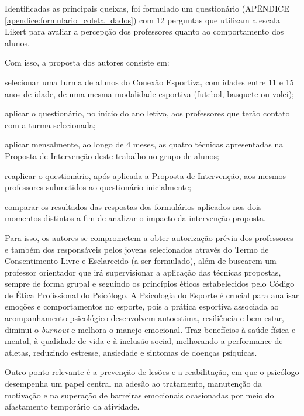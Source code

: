 \begin{Desenvolvimento}
Identificadas as principais queixas, foi formulado um questionário (APÊNDICE \ref{apendice:formulario_coleta_dados}) com 12 perguntas que utilizam a escala Likert para avaliar a percepção dos professores quanto ao comportamento dos alunos.

Com isso, a proposta dos autores consiste em:
\begin{alinea}
  \item selecionar uma turma de alunos do Conexão Esportiva, com idades entre 11 e 15 anos de idade, de uma mesma modalidade esportiva (futebol, basquete ou volei);
  \item aplicar o questionário, no início do ano letivo, aos professores que terão contato com a turma selecionada;
  \item aplicar mensalmente, ao longo de 4 meses, as quatro técnicas apresentadas na Proposta de Intervenção deste trabalho no grupo de alunos;
  \item reaplicar o questionário, após aplicada a Proposta de Intervenção, aos mesmos professores submetidos ao questionário inicialmente;
  \item comparar os resultados das respostas dos formulários aplicados nos dois momentos distintos a fim de analizar o impacto da intervenção proposta.
\end{alinea}

Para isso, os autores se comprometem a obter autorização prévia dos professores e também dos responsáveis pelos jovens selecionados através do Termo de Consentimento Livre e Esclarecido (a ser formulado), além de buscarem um professor orientador que irá supervisionar a aplicação das técnicas propostas, sempre de forma grupal e seguindo os princípios éticos estabelecidos pelo Código de Ética Profissional do Psicólogo.
A Psicologia do Esporte é crucial para analisar emoções e comportamentos no esporte, pois a prática esportiva associada ao acompanhamento psicológico desenvolvem autoestima, resiliência e bem-estar, diminui o \textit{burnout} e melhora o manejo emocional. Traz benefícios à saúde física e mental, à qualidade de vida e à inclusão social, melhorando a performance de atletas, reduzindo estresse, ansiedade e sintomas de doenças psíquicas.

Outro ponto relevante é a prevenção de lesões e a reabilitação, em que o psicólogo desempenha um papel central na adesão ao tratamento, manutenção da motivação e na superação de barreiras emocionais ocasionadas por meio do afastamento temporário da atividade.


\end{Desenvolvimento}

